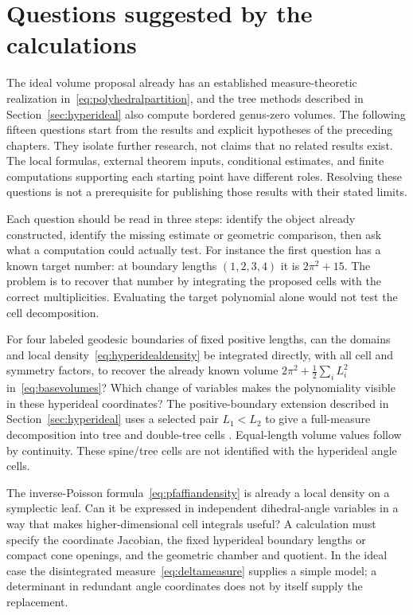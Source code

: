 \section{Questions suggested by the calculations}
\label{sec:questions}

The ideal volume proposal already has an established measure-theoretic
realization in~\eqref{eq:polyhedralpartition}, and the tree methods described
in Section~\ref{sec:hyperideal} also compute bordered genus-zero volumes.
The following fifteen questions start from the results and explicit
hypotheses of the preceding chapters. They isolate further research,
not claims that no related results exist. The local formulas, external
theorem inputs, conditional estimates, and finite computations supporting
each starting point have different roles. Resolving these questions is
not a prerequisite for publishing those results with their stated limits.

Each question should be read in three steps: identify the object
already constructed, identify the missing estimate or geometric
comparison, then ask what a computation could actually test.
For instance the first question has a known target number:
at boundary lengths $(1,2,3,4)$ it is $2\pi^2+15$.
The problem is to recover that number by integrating the proposed
cells with the correct multiplicities. Evaluating the target
polynomial alone would not test the cell decomposition.

\begin{question}
For four labeled geodesic boundaries of fixed positive lengths, can the
domains and local density~\eqref{eq:hyperidealdensity} be integrated
directly, with all cell and symmetry factors, to recover the already
known volume $2\pi^2+\frac12\sum_iL_i^2$ in~\eqref{eq:basevolumes}?
Which change of variables makes the polynomiality visible in these
hyperideal coordinates? The positive-boundary extension described in
Section~\ref{sec:hyperideal} uses a selected pair $L_1<L_2$ to give a
full-measure decomposition into tree and double-tree cells
\cite[Theorem~3]{Zonneveld}. Equal-length volume values follow by
continuity. These spine/tree cells are not identified with the
hyperideal angle cells.
\end{question}

\begin{question}
The inverse-Poisson formula~\eqref{eq:pfaffiandensity} is already a local
density on a symplectic leaf. Can it be expressed in independent
dihedral-angle variables in a way that makes higher-dimensional cell
integrals useful? A calculation must specify the coordinate Jacobian,
the fixed hyperideal boundary lengths or compact cone openings, and the
geometric chamber and quotient. In the ideal case the disintegrated
measure~\eqref{eq:deltameasure} supplies a simple model; a determinant
in redundant angle coordinates does not by itself supply the replacement.
\end{question}

